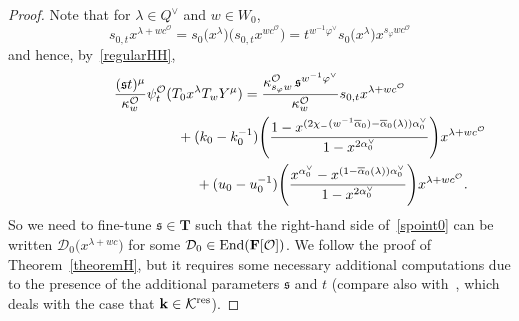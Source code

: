 \documentclass[pdftex]{sigma}
\numberwithin{equation}{section}
\begin{document}
\begin{proof}
Note that for $\lambda\in Q^\vee$ and $w\in W_0$,
\begin{equation*}
s_{0,t}x^{\lambda+wc^\mathcal{O}}=s_0\bigl(x^\lambda\bigr)\bigl(s_{0,t}x^{wc^\mathcal{O}}\bigr)=t^{w^{-1}\varphi^\vee}s_0\bigl(x^\lambda\bigr)x^{s_\varphi wc^\mathcal{O}}
\end{equation*}
and hence, by~\eqref{regularHH},
\begin{gather}
\frac{(\mathfrak{s}t)^\mu}{\kappa_w^\mathcal{O}}\psi_{t}^\mathcal{O}(T_0x^\lambda T_wY^\mu)=\frac{\kappa_{s_\varphi w}^\mathcal{O}\,\mathfrak{s}^{w^{-1}\varphi^\vee}}{\kappa_w^\mathcal{O}}s_{0,t}x^{\lambda+wc^\mathcal{O}}\nonumber\\
\hphantom{\frac{(\mathfrak{s}t)^\mu}{\kappa_w^\mathcal{O}}\psi_{t}^\mathcal{O}(T_0x^\lambda T_wY^\mu)=}{}
+(k_0-k_0^{-1})\Biggl(\frac{1-x^{(2\chi_-(w^{-1}\overline{\alpha}_0)-\overline{\alpha}_0(\lambda))\alpha_0^\vee}}{1-x^{2\alpha_0^\vee}}\Biggr)x^{\lambda+wc^\mathcal{O}}\nonumber\\
\hphantom{\frac{(\mathfrak{s}t)^\mu}{\kappa_w^\mathcal{O}}\psi_{t}^\mathcal{O}(T_0x^\lambda T_wY^\mu)=}{}
+(u_0-u_0^{-1})\Biggl(\frac{x^{\alpha_0^\vee}-x^{(1-\overline{\alpha}_0(\lambda))\alpha_0^\vee}}{1-x^{2\alpha_0^\vee}}\Biggr)x^{\lambda+wc^\mathcal{O}}.
\label{spoint0}
\end{gather}
So we need to fine-tune $\mathfrak{s}\in\mathbf{T}$ such that the right-hand side of~\eqref{spoint0} can be written
$\mathcal{D}_0\bigl(x^{\lambda+wc}\bigr)$ for
some $\mathcal{D}_0\in\textup{End}(\mathbf{F}[\mathcal{O}])$.
We follow the proof of Theorem~\ref{theoremH}, but it requires some necessary additional computations due to the presence of the additional parameters $\mathfrak{s}$ and $t$ (compare also with~\cite[Section~5]{SSV2}, which deals with the case that $\mathbf{k}\in\mathcal{K}^{{\rm res}}$).


\end{proof}
\end{document}
